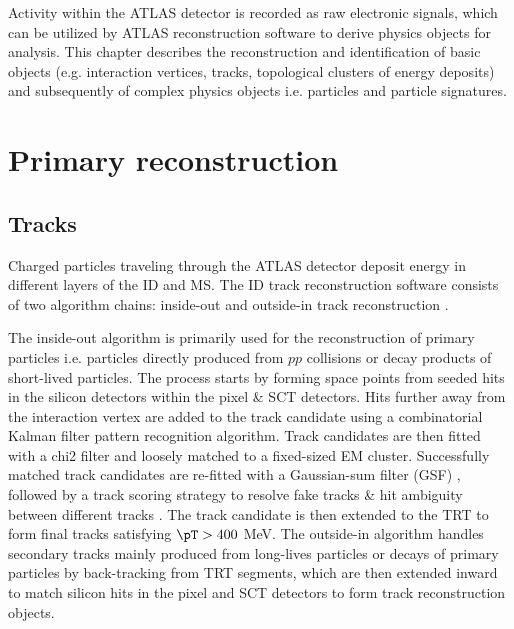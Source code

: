 \documentclass[../thesis.tex]{subfiles}
\begin{document}
\vspace{-1\baselineskip}

Activity within the \acs{ATLAS} detector is recorded as raw electronic signals, which can be utilized by \acs{ATLAS} reconstruction software to derive physics objects for analysis. This chapter describes the reconstruction and identification of basic objects (e.g. interaction vertices, tracks, topological clusters of energy deposits) and subsequently of complex physics objects i.e. particles and particle signatures.

\section{Primary reconstruction}
\label{sec:primaryreco}

\subsection{Tracks}

Charged particles traveling through the ATLAS detector deposit energy in different layers of the \acs{ID} and \acs{MS}. The \acs{ID} track reconstruction software consists of two algorithm chains: inside-out and outside-in track reconstruction \citep{reco:track,reco:io,reco:oi}.

The inside-out algorithm is primarily used for the reconstruction of primary particles i.e. particles directly produced from $pp$ collisions or decay products of short-lived particles. The process starts by forming space points from seeded hits in the silicon detectors within the pixel \& \acs{SCT} detectors. Hits further away from the interaction vertex are added to the track candidate using a combinatorial Kalman filter \citep{reco:kalman} pattern recognition algorithm. Track candidates are then fitted with a \acs{chi2} filter \citep{reco:track_chi2} and loosely matched to a fixed-sized \acs{EM} cluster. Successfully matched track candidates are re-fitted with a Gaussian-sum filter (\acs{GSF}) \citep{reco:track_gsf}, followed by a track scoring strategy to resolve fake tracks \& hit ambiguity between different tracks \citep{reco:track_ambiguity}. The track candidate is then extended to the \acs{TRT} to form final tracks satisfying $\pT > 400$ MeV. The outside-in algorithm handles secondary tracks mainly produced from long-lives particles or decays of primary particles by back-tracking from \acs{TRT} segments, which are then extended inward to match silicon hits in the pixel and \acs{SCT} detectors to form track reconstruction objects.
\end{document}
